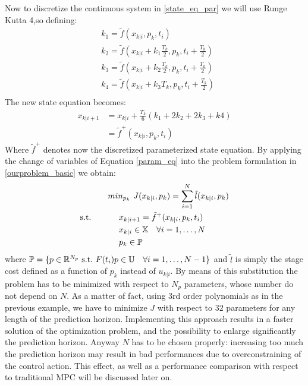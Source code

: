 Now to discretize the continuous system in \ref{state_eq_par} we will use Runge Kutta 4,so defining: 
\begin{equation*}
\begin{split}
    &k_1 = \tilde{f}(x_{k|i},p_k,t_i) \\
	&k_2 = \tilde{f}(x_{k|i}+k_1\frac{T_k}{2},p_k,t_i+\frac{T_k}{2}) \\
	&k_3 = \tilde{f}(x_{k|i}+k_2\frac{T_k}{2},p_k,t_i+\frac{T_k}{2})\\
	&k_4 = \tilde{f}(x_{k|i}+k_3T_k,p_k,t_i+\frac{T_k}{2})\\
\end{split}	
\end{equation*}
The new state equation becomes:  
\begin{equation}
\begin{split}
	x_{k|i+1}&=x_{k|i}+\frac{T_k}{6}(k_1+2k_2+2k_3+k4) \\
	&=\tilde{f}^+(x_{k|i},p_k,t_i)
\end{split}
\end{equation}
Where $\tilde{f}^+$ denotes now the discretized parameterized state equation.
By applying the change of variables of Equation \ref{param_eq} into the problem formulation in \ref{ourproblem_basic} we obtain:
\begin{equation} \label{ourproblem_param}
\begin{split}
		& min_{p_k}\ J({x}_{k|i},p_k) = \sum_{i=1}^{N}\tilde{l}({x}_{k|i},p_k) \\
		\textnormal{s.t.}\qquad
		&\ \ \ \ x_{k|i+1}=\tilde{f}^+(x_{k|i},p_k,t_i) \\
		&\ \ \ \ {x}_{k|i} \in \mathbb{X}\quad \forall i=1,\dots, N  \\
		&\ \ \ \ p_k   \in \mathbb{P}\ \\
	\end{split}	
\end{equation}
where $\mathbb{P} = \lbrace p\in \mathbb{R}^{N_p}\ \textnormal{s.t.}\ F(t_i)p \in \mathbb{U}\quad \forall i = 1, \dots, N-1 \rbrace $ and $\tilde{l}$ is simply the stage cost defined as a function of $p_k$ instead of ${u}_{k|i}$. By means of this substitution the problem has to be minimized with respect to $N_p$ parameters, whose number do not depend on $N$. As a matter of fact, using 3rd order polynomials as in the previous example, we have to minimize $J$ with respect to $32$ parameters for any length of the prediction horizon. Implementing this approach results in a faster solution of the optimization problem, and the possibility to enlarge significantly the prediction horizon. Anyway $N$ has to be chosen properly: increasing too much the prediction horizon may result in bad performances due to overconstraining of the control action. This effect, as well as a performance comparison with respect to traditional MPC will be discussed later on.


